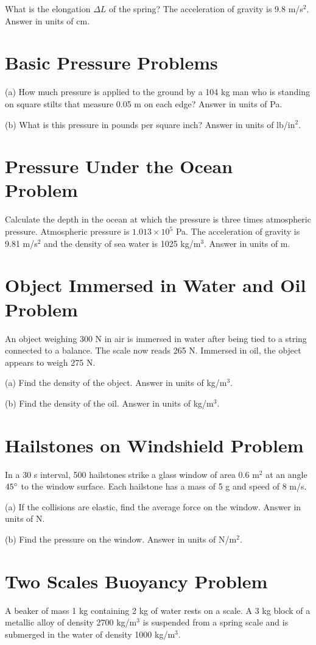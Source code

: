 \documentclass[../physics12.tex]{subfiles}
\begin{document}
What is the elongation $\Delta L$ of the spring? The acceleration of gravity is 9.8 m/s$^2$. Answer in units of cm.

\section{Basic Pressure Problems}
(a) How much pressure is applied to the ground by a 104 kg man who is standing on square stilts that measure 0.05 m on each edge? Answer in units of Pa.

(b) What is this pressure in pounds per square inch? Answer in units of lb/in$^2$.

\section{Pressure Under the Ocean Problem}
Calculate the depth in the ocean at which the pressure is three times atmospheric pressure. Atmospheric pressure is $1.013\times 10^5$ Pa. The acceleration of gravity is 9.81 m/s$^2$ and the density of sea water is 1025 kg/m$^3$. Answer in units of m.

\section{Object Immersed in Water and Oil Problem}
An object weighing 300 N in air is immersed in water after being tied to a string connected to a balance. The scale now reads 265 N. Immersed in oil, the object appears to weigh 275 N.

(a) Find the density of the object. Answer in units of kg/m$^3$.

(b) Find the density of the oil. Answer in units of kg/m$^3$.

\section{Hailstones on Windshield Problem}
In a 30 s interval, 500 hailstones strike a glass window of area 0.6 m$^2$ at an angle $45\degree$ to the window surface. Each hailstone has a mass of 5 g and speed of 8 m/s.

(a) If the collisions are elastic, find the average force on the window. Answer in units of N.

(b) Find the pressure on the window. Answer in units of N/m$^2$.

\section{Two Scales Buoyancy Problem}
A beaker of mass 1 kg containing 2 kg of water rests on a scale. A 3 kg block of a metallic alloy of density 2700 kg/m$^3$ is suspended from a spring scale and is submerged in the water of density 1000 kg/m$^3$.
\end{document}
